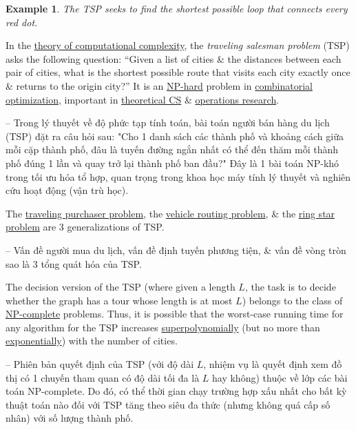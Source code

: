 \documentclass{article}
\newtheorem{example}{Example}
\begin{document}
\begin{example}
    The TSP seeks to find the shortest possible loop that connects every red dot.
\end{example}
In the \href{https://en.wikipedia.org/wiki/Computational_complexity_theory}{theory of computational complexity}, the {\it traveling salesman problem} (TSP) asks the following question: ``Given a list of cities \& the distances between each pair of cities, what is the shortest possible route that visits each city exactly once \& returns to the origin city?'' It is an \href{https://en.wikipedia.org/wiki/NP-hardness}{NP-hard} problem in \href{https://en.wikipedia.org/wiki/Combinatorial_optimization}{combinatorial optimization}, important in \href{https://en.wikipedia.org/wiki/Theoretical_computer_science}{theoretical CS} \& \href{https://en.wikipedia.org/wiki/Operations_research}{operations research}.

-- Trong lý thuyết về độ phức tạp tính toán, bài toán người bán hàng du lịch (TSP) đặt ra câu hỏi sau: "Cho 1 danh sách các thành phố và khoảng cách giữa mỗi cặp thành phố, đâu là tuyến đường ngắn nhất có thể đến thăm mỗi thành phố đúng 1 lần và quay trở lại thành phố ban đầu?" Đây là 1 bài toán NP-khó trong tối ưu hóa tổ hợp, quan trọng trong khoa học máy tính lý thuyết và nghiên cứu hoạt động (vận trù học).

The \href{https://en.wikipedia.org/wiki/Traveling_purchaser_problem}{traveling purchaser problem}, the \href{https://en.wikipedia.org/wiki/Vehicle_routing_problem}{vehicle routing problem}, \& the \href{https://en.wikipedia.org/wiki/Ring_star_problem}{ring star problem} are 3 generalizations of TSP.

-- Vấn đề người mua du lịch, vấn đề định tuyến phương tiện, \& vấn đề vòng tròn sao là 3 tổng quát hóa của TSP.

The decision version of the TSP (where given a length $L$, the task is to decide whether the graph has a tour whose length is at most $L$) belongs to the class of \href{https://en.wikipedia.org/wiki/NP-completeness}{NP-complete} problems. Thus, it is possible that the worst-case running time for any algorithm for the TSP increases \href{https://en.wikipedia.org/wiki/Time_complexity#Superpolynomial_time}{superpolynomially} (but no more than \href{https://en.wikipedia.org/wiki/Exponential_time_hypothesis}{exponentially}) with the number of cities.

-- Phiên bản quyết định của TSP (với độ dài $L$, nhiệm vụ là quyết định xem đồ thị có 1 chuyến tham quan có độ dài tối đa là $L$ hay không) thuộc về lớp các bài toán NP-complete. Do đó, có thể thời gian chạy trường hợp xấu nhất cho bất kỳ thuật toán nào đối với TSP tăng theo siêu đa thức (nhưng không quá cấp số nhân) với số lượng thành phố.
\end{document}
